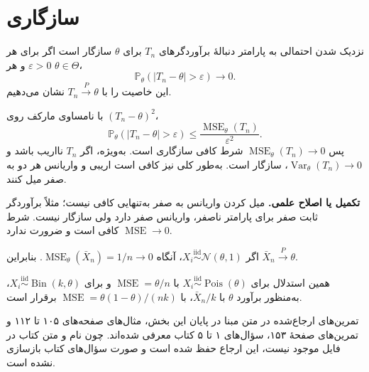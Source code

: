 \documentclass[12pt,a4paper,oneside]{report}
\newcounter{ex}[chapter]
\newenvironment{example}[1]{\refstepcounter{ex}\begin{tcolorbox}[breakable=false,title={مثال \thechapter.\arabic{ex} | #1},colframe=muted,colback=white]}{\end{tcolorbox}}
\newcommand{\edit}[1]{\par\begingroup\small\color{alert}\textbf{تکمیل یا اصلاح علمی.} #1\par\endgroup}
\newcommand{\Var}{\operatorname{Var}}
\newcommand{\MSE}{\operatorname{MSE}}
\newcommand{\iid}{\overset{\mathrm{iid}}{\sim}}
\newcommand{\N}{\mathcal N}
\newcommand{\Prob}{\mathbb P}
\begin{document}
\section{سازگاری}
\begin{definition}{نزدیک شدن احتمالی به پارامتر}
دنبالهٔ برآوردگرهای $T_n$ برای $\theta$ سازگار است اگر برای هر $\varepsilon>0$ و هر $\theta\in\Theta$،
\[
\Prob_\theta(|T_n-\theta|>\varepsilon)\longrightarrow0.
\]
این خاصیت را با $T_n\xrightarrow{P}\theta$ نشان می‌دهیم.
\end{definition}
با نامساوی مارکف روی $(T_n-\theta)^2$،
\[
\Prob_\theta(|T_n-\theta|>\varepsilon)
\le\frac{\MSE_\theta(T_n)}{\varepsilon^2}.
\]
پس $\MSE_\theta(T_n)\to0$ شرط کافی سازگاری است. به‌ویژه، اگر $T_n$ نااریب باشد و $\Var_\theta(T_n)\to0$، سازگار است. به‌طور کلی نیز کافی است اریبی و واریانس هر دو به صفر میل کنند.
\edit{میل کردن واریانس به صفر به‌تنهایی کافی نیست؛ مثلاً برآوردگر ثابت صفر برای پارامتر ناصفر، واریانس صفر دارد ولی سازگار نیست. شرط $\MSE\to0$ کافی است و ضرورت ندارد.}
\begin{example}{سازگاری میانگین}
اگر $X_i\iid\N(\theta,1)$، آنگاه $\MSE_\theta(\bar X_n)=1/n\to0$. بنابراین $\bar X_n\xrightarrow{P}\theta$.

همین استدلال برای $X_i\iid\operatorname{Pois}(\theta)$ با $\MSE=\theta/n$ و برای $X_i\iid\operatorname{Bin}(k,\theta)$، به‌منظور برآورد $\theta$ با $\bar X_n/k$، با $\MSE=\theta(1-\theta)/(nk)$ برقرار است.
\end{example}
\begin{important}{تمرین‌های ارجاع‌شده در متن مبنا}
در پایان این بخش، مثال‌های صفحه‌های ۱۰۵ تا ۱۱۲ و تمرین‌های صفحهٔ ۱۵۳، سؤال‌های ۱ تا ۵ کتاب معرفی شده‌اند. چون نام و متن کتاب در فایل موجود نیست، این ارجاع حفظ شده است و صورت سؤال‌های کتاب بازسازی نشده است.
\end{important}
\end{document}
